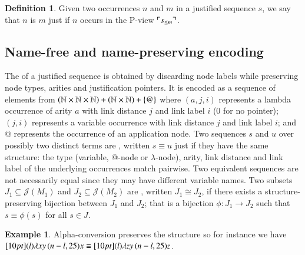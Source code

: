 \documentclass{elsarticle}
\theoremstyle{plain}
\theoremstyle{definition}
\newtheorem{definition}{Definition}[section]
\newtheorem{example}{Example}[section]
\def\structisomorphic{\cong} %
\def\justseqset{\mathcal{J}}
\begin{document}
\begin{definition}
\fi
Given two occurrences $n$ and $m$ in a justified sequence $s$, we say that $n$ is  $m$ just if $n$ occurs in the P-view $\ulcorner s_{\leq m} \urcorner$.
\end{definition}

\subsection{Name-free and name-preserving encoding}
The  of a justified sequence is obtained by discarding node labels while preserving node types, arities and justification pointers. It is encoded as a sequence of elements from
$(\mathbb{N}\times\mathbb{N}\times\mathbb{N}) +
   (\mathbb{N}\times\mathbb{N})
   + \{ @ \}$
where $(a, j, i)$ represents a lambda occurrence of arity $a$
with link distance $j$ and link label $i$ ($0$ for no pointer);
$(j, i)$ represents a variable occurrence
with link distance $j$ and link label $i$;
and $@$ represents the occurrence of an application node.
%
Two sequences $s$ and $u$ over possibly two distinct terms are , written $s \equiv u$ just if they have the same structure: the type (variable, @-node or $\lambda$-node), arity, link distance and link label of the underlying occurrences match pairwise. Two equivalent sequences are not necessarily equal since they may have different variable names.
Two subsets $J_1\subseteq \justseqset(M_1)$ and $J_2\subseteq\justseqset(M_2)$ are , written $J_1\structisomorphic J_2$, if  there exists a structure-preserving bijection between $J_1$ and $J_2$; that is a bijection $\phi :J_1\longrightarrow J_2$ such that $s\equiv\phi(s)$ for all $s\in J$.

\begin{example}
    Alpha-conversion preserves the structure so for instance we have
    $\Pstr[10pt]{ (l){\lambda x y} \, (n-l,25){x} } \equiv \Pstr[10pt]{ (l){\lambda z y} \, (n-l,25){z}}$.
\end{example}
\end{document}
